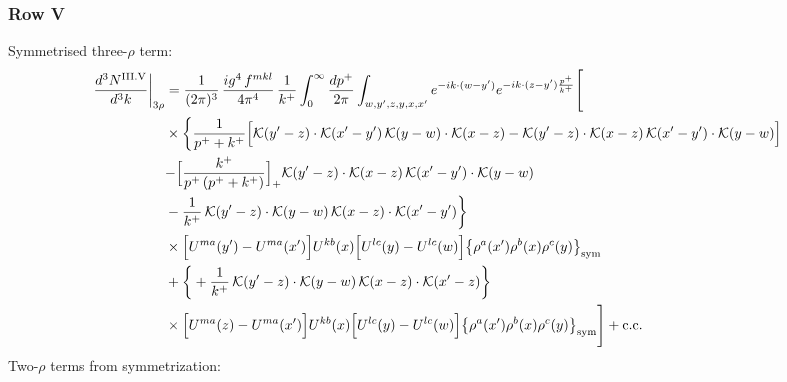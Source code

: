 \documentclass[9pt]{article}
\numberwithin{equation}{section}
\begin{document}
\subsubsection*{Row V}
Symmetrised three-$\rho$ term:
\begin{align}
\frac{d^{3}N^{\rm III.V}}{d^{3}k}\bigg|_{3\rho}&=\frac{1}{(2\pi)^{3}}\,\frac{ig^{4}\,f^{mkl}}{4\pi^{4}}\,\frac{1}{k^{+}}\int_{0}^{\infty}\frac{dp^{+}}{2\pi}\int_{w,y',z,y,x,x'}e^{-ik\cdot{(w-y')}}e^{-ik\cdot{(z-y')}\frac{p^{+}}{k^{+}}}\Bigg[\notag\\
&\times\bigg\{\frac{1}{p^{+}+k^{+}}\Big[\mathcal{K}(y'-z)\cdot\mathcal{K}(x'-y')\,\mathcal{K}(y-w)\cdot\mathcal{K}(x-z)-\mathcal{K}(y'-z)\cdot\mathcal{K}(x-z)\,\mathcal{K}(x'-y')\cdot\mathcal{K}(y-w)\Big]\notag\\
&{-\Big[\frac{k^{+}}{p^{+}\,(p^{+}+k^{+})}\Big]_{+}\mathcal{K}(y'-z)\cdot\mathcal{K}(x-z)\,\mathcal{K}(x'-y')\cdot\mathcal{K}(y-w)}\notag\\
&-\frac{1}{k^{+}}\,\mathcal{K}(y'-z)\cdot\mathcal{K}(y-w)\,\mathcal{K}(x-z)\cdot\mathcal{K}(x'-y')\bigg\}\notag\\
&\times \Big[U^{ma}(y')-U^{ma}(x')\Big]U^{kb}(x)\Big[U^{lc}(y)-U^{lc}(w)\Big]\big\{\rho^{a}(x')\rho^{b}(x)\rho^{c}(y)\big\}_{\rm sym}\notag\\
&+\bigg\{+\frac{1}{k^{+}}\,\mathcal{K}(y'-z)\cdot\mathcal{K}(y-w)\,\mathcal{K}(x-z)\cdot\mathcal{K}(x'-z)\bigg\}\notag\\
&\times \Big[U^{ma}(z)-U^{ma}(x')\Big]U^{kb}(x)\Big[U^{lc}(y)-U^{lc}(w)\Big]\big\{\rho^{a}(x')\rho^{b}(x)\rho^{c}(y)\big\}_{\rm sym}\Bigg]+{\rm c.c.}\label{eq:D-III.V-3}
\end{align}
Two-$\rho$ terms from symmetrization: 
\end{document}
